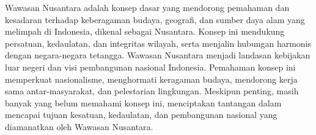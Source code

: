 Wawasan Nusantara adalah konsep dasar yang mendorong pemahaman dan kesadaran terhadap keberagaman budaya, geografi, dan sumber daya alam yang melimpah di Indonesia, dikenal sebagai Nusantara. Konsep ini mendukung persatuan, kedaulatan, dan integritas wilayah, serta menjalin hubungan harmonis dengan negara-negara tetangga. Wawasan Nusantara menjadi landasan kebijakan luar negeri dan visi pembangunan nasional Indonesia. Pemahaman konsep ini memperkuat nasionalisme, menghormati keragaman budaya, mendorong kerja sama antar-masyarakat, dan pelestarian lingkungan. Meskipun penting, masih banyak yang belum memahami konsep ini, menciptakan tantangan dalam mencapai tujuan kesatuan, kedaulatan, dan pembangunan nasional yang diamanatkan oleh Wawasan Nusantara.

